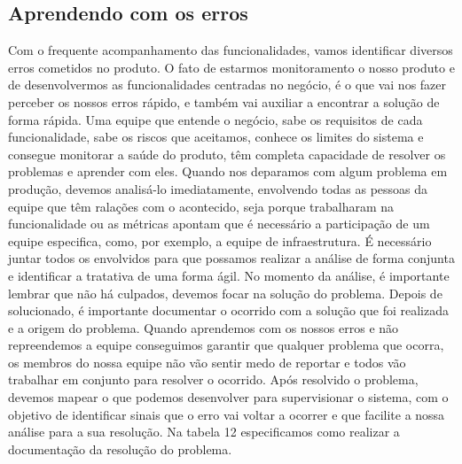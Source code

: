     \subsection{Aprendendo com os erros}
      Com o frequente acompanhamento das funcionalidades, vamos identificar
      diversos erros cometidos no produto. O fato de estarmos monitoramento o nosso
      produto e de desenvolvermos as funcionalidades centradas no negócio, é o que
      vai nos fazer perceber os nossos erros rápido, e também vai auxiliar
      a encontrar a solução de forma rápida. Uma equipe que entende o negócio,
      sabe os requisitos de cada funcionalidade, sabe os riscos que aceitamos,
      conhece os limites do sistema e consegue monitorar a saúde do produto, têm
      completa capacidade de resolver os problemas e aprender com eles. \newline
      Quando nos deparamos com algum problema em produção, devemos analisá-lo
      imediatamente, envolvendo todas as pessoas da equipe que têm ralações com o
      acontecido, seja porque trabalharam na funcionalidade ou as métricas apontam
      que é necessário a participação de um equipe especifica, como, por exemplo, a
      equipe de infraestrutura. É necessário juntar todos os envolvidos para que
      possamos realizar a análise de forma conjunta e identificar a tratativa de
      uma forma ágil. No momento da análise, é importante lembrar que não há
      culpados, devemos focar na solução do problema. Depois de solucionado, é
      importante documentar o ocorrido com a solução que foi realizada e a origem
      do problema. Quando aprendemos com os nossos erros e não repreendemos a
      equipe conseguimos garantir que qualquer problema que ocorra, os membros do
      nossa equipe não vão sentir medo de reportar e todos vão trabalhar em conjunto
      para resolver o ocorrido. Após resolvido o problema, devemos mapear o que
      podemos desenvolver para supervisionar o sistema, com o objetivo de identificar
      sinais que o erro vai voltar a ocorrer e que facilite a nossa análise para
      a sua resolução. Na tabela 12 especificamos como realizar a documentação
      da resolução do problema. \newline

